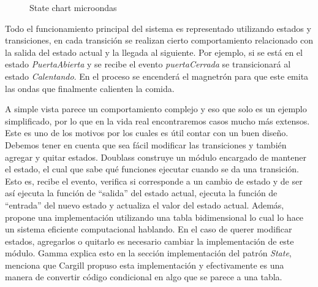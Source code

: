 \begin{figure}[h]
\caption{State chart microondas}
\begin{center}
\end{center}
\end{figure}

Todo el funcionamiento principal del sistema es representado utilizando estados y transiciones, en cada transición se realizan cierto comportamiento relacionado con la salida del estado actual y la llegada al siguiente. Por ejemplo, si se está en el estado \textit{PuertaAbierta} y se recibe el evento \textit{puertaCerrada} se transicionará al estado \textit{Calentando}. En el proceso se encenderá el magnetrón para que este emita las ondas que finalmente calienten la comida.

A simple vista parece un comportamiento complejo y eso que solo es un ejemplo simplificado, por lo que en la vida real encontraremos casos mucho más extensos. Este es uno de los motivos por los cuales es útil contar con un buen diseño. Debemos tener en cuenta que sea fácil modificar las transiciones y también agregar y quitar estados. Doublass construye un módulo encargado de mantener el estado, el cual que sabe qué funciones ejecutar cuando se da una transición. Esto es, recibe el evento, verifica si corresponde a un cambio de estado y de ser así ejecuta la función de ``salida'' del estado actual, ejecuta la función de ``entrada'' del nuevo estado y actualiza el valor del estado actual. Además, propone una implementación utilizando una tabla bidimensional lo cual lo hace un sistema eficiente computacional hablando. En el caso de querer modificar estados, agregarlos o quitarlo es necesario cambiar la implementación de este módulo. Gamma explica esto en la sección implementación del patrón \textit{State}, menciona que Cargill propuso esta implementación y efectivamente es una manera de convertir código condicional en algo que se parece a una tabla.

